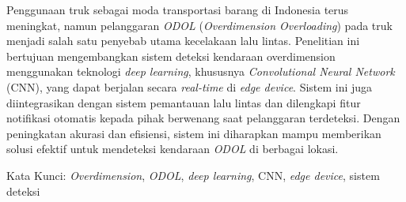 Penggunaan truk sebagai moda transportasi barang di Indonesia terus meningkat, namun pelanggaran \emph{ODOL} (\emph{Overdimension Overloading}) pada truk menjadi salah satu penyebab utama kecelakaan lalu lintas. Penelitian ini bertujuan mengembangkan sistem deteksi kendaraan overdimension menggunakan teknologi \emph{deep learning}, khususnya \emph{Convolutional Neural Network} (CNN), yang dapat berjalan secara \emph{real-time} di \emph{edge device}. Sistem ini juga diintegrasikan dengan sistem pemantauan lalu lintas dan dilengkapi fitur notifikasi otomatis kepada pihak berwenang saat pelanggaran terdeteksi. Dengan peningkatan akurasi dan efisiensi, sistem ini diharapkan mampu memberikan solusi efektif untuk mendeteksi kendaraan \emph{ODOL} di berbagai lokasi.

Kata Kunci: \emph{Overdimension}, \emph{ODOL}, \emph{deep learning}, CNN, \emph{edge device}, sistem deteksi

